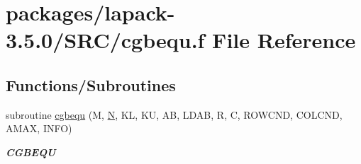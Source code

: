 \hypertarget{cgbequ_8f}{}\section{packages/lapack-\/3.5.0/\+S\+R\+C/cgbequ.f File Reference}
\label{cgbequ_8f}
\subsection*{Functions/\+Subroutines}
\begin{DoxyCompactItemize}
\item 
subroutine \hyperlink{group__complexGBcomputational_gaf843a252d609da737df565e1d3461284}{cgbequ} (M, \hyperlink{polmisc_8c_a0240ac851181b84ac374872dc5434ee4}{N}, K\+L, K\+U, A\+B, L\+D\+A\+B, R, C, R\+O\+W\+C\+N\+D, C\+O\+L\+C\+N\+D, A\+M\+A\+X, I\+N\+F\+O)
\begin{DoxyCompactList}\small\item\em {\bfseries C\+G\+B\+E\+Q\+U} \end{DoxyCompactList}\end{DoxyCompactItemize}
